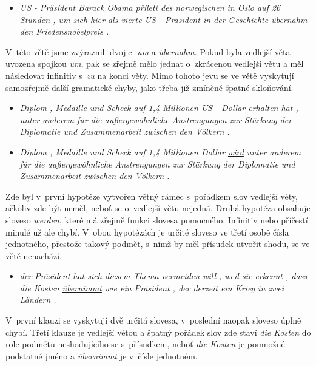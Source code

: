 \documentclass[12pt,a4paper]{report}
\begin{document}
\begin{itemize}
\item{\textit{US - Präsident Barack Obama přiletí des norwegischen in Oslo auf 26 Stunden , {\underline{\color{red}um}} sich hier als vierte US - Präsident in der Geschichte \underline{\color{red}übernahm} den Friedensnobelpreis .}}
\end{itemize}


V~této větě jsme zvýraznili dvojici \textit{um} a \textit{übernahm}. Pokud byla vedlejší věta uvozena spojkou \textit{um}, pak se zřejmě mělo jednat o~zkrácenou vedlejší větu a měl následovat infinitiv s~\textit{zu} na konci věty. Mimo tohoto jevu se ve větě vyskytují samozřejmě další gramatické chyby, jako třeba již zmíněné špatné skloňování.

\begin{itemize}
\item{\textit{Diplom , Medaille und Scheck auf 1,4 Millionen US - Dollar \underline{\color{red}erhalten hat} , unter anderem für die außergewöhnliche Anstrengungen zur Stärkung der Diplomatie und Zusammenarbeit zwischen den Völkern .}}
\item{\textit{Diplom , Medaille und Scheck auf 1,4 Millionen Dollar \underline{\color{red}wird} unter anderem für die außergewöhnliche Anstrengungen zur Stärkung der Diplomatie und Zusammenarbeit zwischen den Völkern .}}
\end{itemize}

Zde byl v~první hypotéze vytvořen větný rámec s~pořádkem slov vedlejší věty, ačkoliv zde být neměl, neboť se o~vedlejší větu nejedná. Druhá hypotéza obsahuje sloveso \textit{werden}, které má zřejmě funkci slovesa pomocného. Infinitiv nebo příčestí minulé už ale chybí. V~obou hypotézách je určité sloveso ve třetí osobě čísla jednotného, přestože takový podmět, s~nímž by měl přísudek utvořit shodu, se ve větě nenachází.

\begin{itemize}
\item{\textit{der Präsident \underline{\color{red}hat} sich diesem Thema vermeiden \underline{\color{red}will} , weil sie erkennt , dass die Kosten \underline{\color{red}übernimmt} wie ein Präsident , der derzeit ein Krieg in zwei Ländern .}}
\end{itemize}

V~první klauzi se vyskytují dvě určitá slovesa, v~poslední naopak sloveso úplně chybí. Třetí klauze je vedlejší větou a špatný pořádek slov zde staví \textit{die Kosten} do role podmětu neshodujícího se s~přísudkem, neboť \textit{die Kosten} je pomnožné podstatné jméno a \textit{übernimmt} je v~čísle jednotném.
\end{document}
